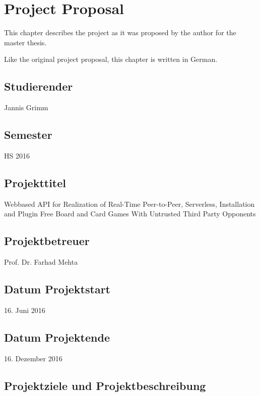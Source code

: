 \chapter{Project Proposal}

This chapter describes the project as it was proposed by the author for the
master thesis.

Like the original project proposal, this chapter is written in German.


\section{Studierender}

Jannis Grimm

\section{Semester}

HS 2016

\section{Projekttitel}

\foreignlanguage{USenglish}{Webbased API for Realization of Real-Time
Peer-to-Peer, Serverless, Installation and Plugin Free Board and Card Games With
Untrusted Third Party Opponents}

\section{Projektbetreuer}

Prof. Dr. Farhad Mehta

\section{Datum Projektstart}

16. Juni 2016

\section{Datum Projektende}

16. Dezember 2016

\section{Projektziele und Projektbeschreibung}

